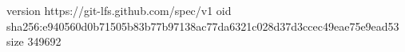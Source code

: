 version https://git-lfs.github.com/spec/v1
oid sha256:e940560d0b71505b83b77b97138ac77da6321c028d37d3ccec49eae75e9ead53
size 349692
